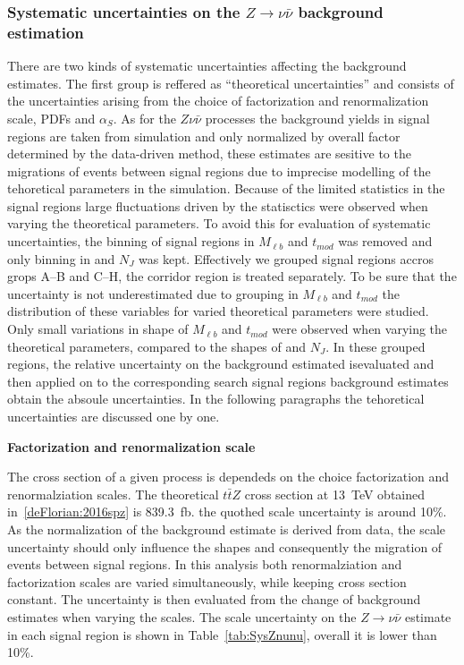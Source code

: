\subsubsection{Systematic uncertainties on the $Z \to \nu \bar{\nu}$ background estimation}

There are two kinds of systematic uncertainties affecting the background estimates. The first group is reffered as ``theoretical uncertainties'' and consists of the uncertainties arising from the choice of factorization and renormalization scale, PDFs and $\alpha_{S}$. As for the $Z \nu \bar{\nu}$ processes the background yields in signal regions are taken from simulation and only normalized by overall factor determined by the data-driven method, these estimates are sesitive to the migrations of events between signal regions due to imprecise modelling of the tehoretical parameters in the simulation. Because of the limited statistics in the signal regions large fluctuations driven by the statisctics were observed when varying the theoretical parameters. To avoid this for evaluation of systematic uncertainties, the binning of signal regions in $M_{\ell b}$ and $t_{mod}$ was removed and only binning in \MET and $N_{J}$ was kept. Effectively we grouped signal regions accros grops A--B and C--H, the corridor region is treated separately. To be sure that the uncertainty is not underestimated due to grouping in $M_{\ell b}$ and $t_{mod}$ the distribution of these variables for varied theoretical parameters were studied. Only small variations in shape of $M_{\ell b}$ and $t_{mod}$ were observed when varying the theoretical parameters, compared to the shapes of \MET and $N_{J}$. In these grouped regions, the relative uncertainty on the background estimated isevaluated and then applied on to the corresponding search signal regions background estimates obtain the absoule uncertainties. In the following paragraphs the tehoretical uncertainties are discussed one by one.


\textbf{Factorization and renormalization scale}

The cross section of a given process is dependeds on the choice factorization and renormalziation scales. The theoretical $t\bar{t}Z$ cross section at 13~TeV obtained in~\ref{deFlorian:2016spz} is 839.3~fb. the quothed scale uncertainty is around 10\%. As the normalization of the background estimate is derived from data, the scale uncertainty should only influence the shapes and consequently the migration of events between signal regions. In this analysis both renormalziation and factorization scales are varied simultaneously, while keeping cross section constant. The uncertainty is then evaluated from the change of background estimates when varying the scales. The scale uncertainty on the $Z \to \nu \bar{\nu}$ estimate in  each signal region is shown in Table~\ref{tab:SysZnunu}, overall it is lower than 10\%.

